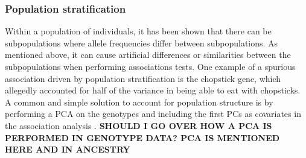\subsubsection{Population stratification}
Within a population of individuals, it has been shown that there can be subpopulations where allele frequencies differ between subpopulations\cite{abdellaoui2013association,genome2014whole}. As mentioned above, it can cause artificial differences or similarities between the subpopulations when performing associations tests. One example of a spurious association driven by population stratification is the chopstick gene, which allegedly accounted for half of the variance in being able to eat with chopsticks.\cite{marees2018tutorial.hamer2000beware} 
A common and simple solution to account for population structure is by performing a PCA on the genotypes and including the first PCs as covariates in the association analysis \cite{price2006principal,price2010new,prive2020efficient}. \textbf{SHOULD I GO OVER HOW A PCA IS PERFORMED IN GENOTYPE DATA? PCA IS MENTIONED HERE AND IN ANCESTRY}


